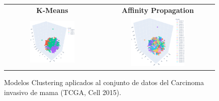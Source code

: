 \begin{figure} 
	\setlength\tabcolsep{3pt}%
	\centering
	\caption{Modelos Clustering aplicados al conjunto de datos del Carcinoma invasivo de mama (TCGA, Cell 2015).}
	\label{TSNE}
	\begin{tabular}{|c|c|}
		\hline
		\textbf{K-Means} &
		\textbf{Affinity Propagation} \\
		\includegraphics[width=0.5\textwidth]{NOTEBOOK/IMAGENES_CLUSTERING/1_TNSE_Kmeans} &
		\includegraphics[width=0.5\textwidth]{NOTEBOOK/IMAGENES_CLUSTERING/2_TNSE_Affinity_Propagation} \\
		\hline
		

\end{tabular}
\end{figure}
